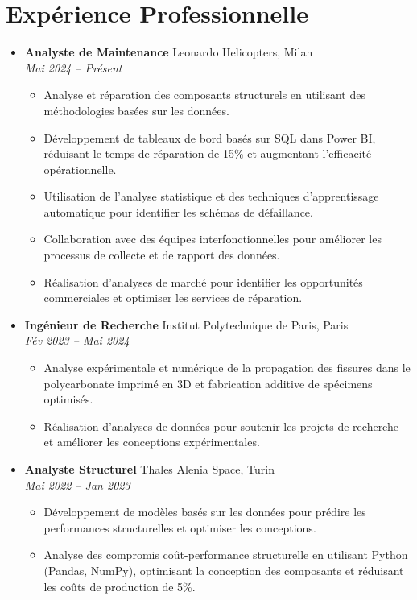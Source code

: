 \documentclass[letterpaper,10.5pt]{article}
\newcommand{\resumeEntry}[4]{
  \item\textbf{#1} \hfill #2\\
  \textit{#3} \hfill \textit{#4}
}
\newcommand{\resumeDescription}[1]{
  \vspace{-3pt}\begin{itemize}[leftmargin=0.2in]
    #1
  \end{itemize}
}
\begin{document}
\section*{Expérience Professionnelle}\vspace{-5pt}
\begin{itemize}[leftmargin=0.2in]
    \resumeEntry{Analyste de Maintenance}{Leonardo Helicopters, Milan}{Mai 2024 -- Présent}{}
    \resumeDescription{
        \item Analyse et réparation des composants structurels en utilisant des méthodologies basées sur les données.
        \item Développement de tableaux de bord basés sur SQL dans Power BI, réduisant le temps de réparation de 15\% et augmentant l'efficacité opérationnelle.
        \item Utilisation de l'analyse statistique et des techniques d'apprentissage automatique pour identifier les schémas de défaillance.
        \item Collaboration avec des équipes interfonctionnelles pour améliorer les processus de collecte et de rapport des données.
        \item Réalisation d'analyses de marché pour identifier les opportunités commerciales et optimiser les services de réparation.
    }
    \resumeEntry{Ingénieur de Recherche}{Institut Polytechnique de Paris, Paris}{Fév 2023 -- Mai 2024}{}
    \resumeDescription{
        \item Analyse expérimentale et numérique de la propagation des fissures dans le polycarbonate imprimé en 3D et fabrication additive de spécimens optimisés.
        \item Réalisation d'analyses de données pour soutenir les projets de recherche et améliorer les conceptions expérimentales.
    }
    \resumeEntry{Analyste Structurel}{Thales Alenia Space, Turin}{Mai 2022 -- Jan 2023}{}
    \resumeDescription{
        \item Développement de modèles basés sur les données pour prédire les performances structurelles et optimiser les conceptions.
        \item Analyse des compromis coût-performance structurelle en utilisant Python (Pandas, NumPy), optimisant la conception des composants et réduisant les coûts de production de 5\%.
    }
\end{itemize}

\end{document}
